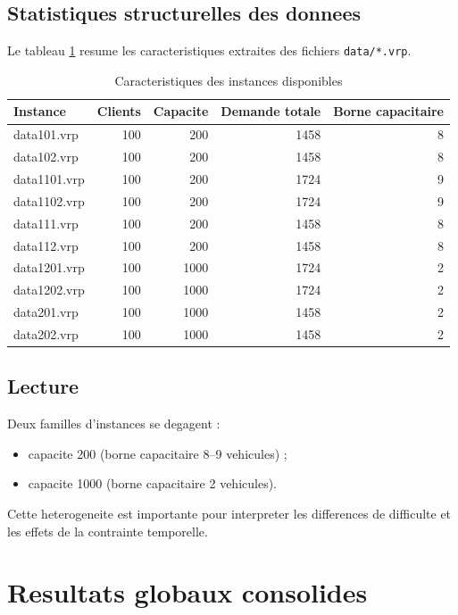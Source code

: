 \documentclass[12pt,a4paper]{report}
\begin{document}
\section{Statistiques structurelles des donnees}
Le tableau \ref{tab:instances} resume les caracteristiques extraites des fichiers \texttt{data/*.vrp}.

\begin{table}[H]
\centering
\caption{Caracteristiques des instances disponibles}
\label{tab:instances}
\begin{tabular}{lrrrr}
\toprule
Instance & Clients & Capacite & Demande totale & Borne capacitaire \\
\midrule
data101.vrp & 100 & 200 & 1458 & 8 \\
data102.vrp & 100 & 200 & 1458 & 8 \\
data1101.vrp & 100 & 200 & 1724 & 9 \\
data1102.vrp & 100 & 200 & 1724 & 9 \\
data111.vrp & 100 & 200 & 1458 & 8 \\
data112.vrp & 100 & 200 & 1458 & 8 \\
data1201.vrp & 100 & 1000 & 1724 & 2 \\
data1202.vrp & 100 & 1000 & 1724 & 2 \\
data201.vrp & 100 & 1000 & 1458 & 2 \\
data202.vrp & 100 & 1000 & 1458 & 2 \\
\bottomrule
\end{tabular}
\end{table}

\section{Lecture}
Deux familles d'instances se degagent :
\begin{itemize}[leftmargin=1.2cm]
  \item capacite 200 (borne capacitaire 8--9 vehicules) ;
  \item capacite 1000 (borne capacitaire 2 vehicules).
\end{itemize}

Cette heterogeneite est importante pour interpreter les differences de difficulte
et les effets de la contrainte temporelle.

\chapter{Resultats globaux consolides}
\end{document}
